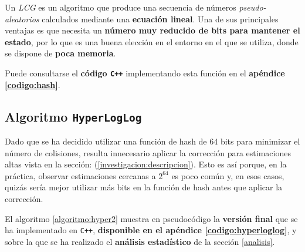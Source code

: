 Un \emph{LCG} es un algoritmo que produce una secuencia de números \emph{pseudo-aleatorios} calculados mediante una
\textbf{ecuación lineal}. Una de sus principales ventajas es que necesita un \textbf{número muy reducido de bits para mantener el
estado}, por lo que es una buena elección en el entorno en el que se utiliza, donde se dispone de \textbf{poca memoria}.

Puede consultarse el \textbf{código \texttt{C++}} implementando esta función en el \textbf{apéndice \ref{codigo:hash}}.

\subsection{Algoritmo \texttt{HyperLogLog}}
\label{implementacion:algoritmo}

Dado que se ha decidido utilizar una función de hash de 64 bits para minimizar el número de colisiones, resulta innecesario aplicar la
corrección para estimaciones altas vista en la sección:  (\ref{investigacion:descripcion}). Esto es así
porque, en la práctica, observar estimaciones cercanas a $2^{64}$ es poco común y, en esos casos, quizás sería mejor utilizar más bits
en la función de hash antes que aplicar la corrección.

El algoritmo \ref{algoritmo:hyper2} muestra en pseudocódigo la \textbf{versión final} que se ha implementado en \texttt{C++},
\textbf{disponible en el apéndice \ref{codigo:hyperloglog}}, y sobre la que se ha realizado el \textbf{análisis estadístico}
de la sección \ref{analisis}.

